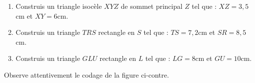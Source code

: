 \documentclass[a4paper,10pt]{report}
\begin{document}
\vspace{-1mm}
\begin{ex}

\medskip
\begin{enumerate}
\item Construis un triangle isocèle $XYZ$ de sommet principal $Z$ tel que : $XZ=3,5$cm et $XY=6$cm.
\item Construis un triangle $TRS$ rectangle en $S$ tel que : $TS=7,2$cm et $SR=8,5$cm.
\item Construis un triangle $GLU$ rectangle en $L$ tel que : $LG=8$cm et $GU=10$cm.
\end{enumerate}
\end{ex}

\begin{ex}

\vspace{-10mm}
\noindent \begin{minipage}{9cm}

\vspace{5mm}
Observe attentivement le codage de la figure ci-contre.\medskip


\end{minipage}
\end{ex}
\end{document}
